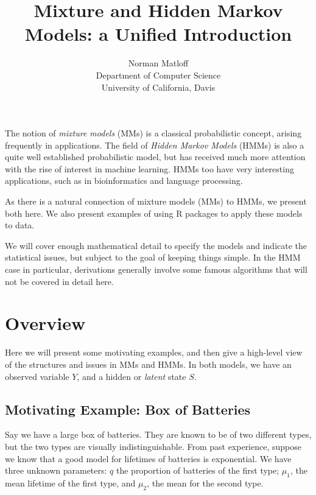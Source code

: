 \documentclass[11pt]{article}
\begin{document}
 

\title{Mixture and Hidden Markov Models: a Unified Introduction}
\author{Norman Matloff \\  
   Department of Computer Science \\
   University of California, Davis}

\maketitle

The notion of \textit{mixture models} (MMs)  is a classical
probabilistic concept, arising frequently in applications.  The field
of \textit{Hidden Markov Models} (HMMs) is also a quite well established
probabilistic model, but has received much more attention with the rise
of interest in machine learning.  HMMs too have very interesting
applications, such as in bioinformatics and language processing.

As there is a natural connection of mixture models (MMs) to HMMs, we
present both here.  We also present examples of using R packages to
apply these models to data.

We will cover enough mathematical detail to specify the models and
indicate the statistical issues, but subject to the goal of keeping
things simple.  In the HMM case in particular, derivations generally
involve some famous algorithms that will not be covered in detail here.

\section{Overview}

Here we will present some motivating examples, and then give a
high-level view of the structures and issues in MMs and HMMs.  In
both models, we have an observed variable $Y$, and a hidden or
\textit{latent} state $S$.

\subsection{Motivating Example:  Box of Batteries}

Say we have a large box of batteries.  They are known to be of two
different types, but the two types are visually indistinguishable.
From past experience, suppose we know that a good model for lifetimes of
batteries is exponential.  We have three unknown parameters: $q$ the
proportion of batteries of the first type; $\mu_1$, the mean lifetime of
the first type, and $\mu_2$, the mean for the second type.
\end{document}
